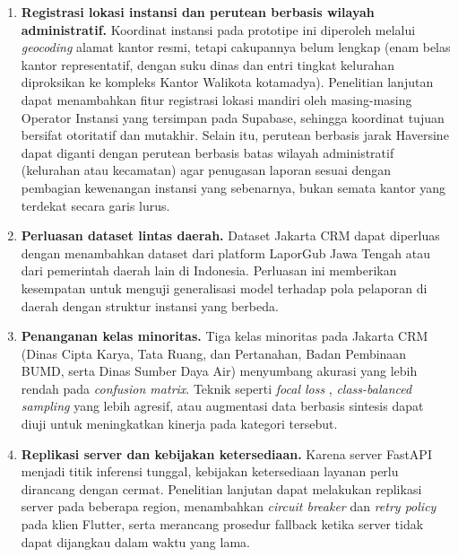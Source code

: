 \begin{enumerate}
    \item \textbf{Registrasi lokasi instansi dan perutean berbasis wilayah administratif.} Koordinat instansi pada prototipe ini diperoleh melalui \textit{geocoding} alamat kantor resmi, tetapi cakupannya belum lengkap (enam belas kantor representatif, dengan suku dinas dan entri tingkat kelurahan diproksikan ke kompleks Kantor Walikota kotamadya). Penelitian lanjutan dapat menambahkan fitur registrasi lokasi mandiri oleh masing-masing Operator Instansi yang tersimpan pada Supabase, sehingga koordinat tujuan bersifat otoritatif dan mutakhir. Selain itu, perutean berbasis jarak Haversine dapat diganti dengan perutean berbasis batas wilayah administratif (kelurahan atau kecamatan) agar penugasan laporan sesuai dengan pembagian kewenangan instansi yang sebenarnya, bukan semata kantor yang terdekat secara garis lurus.

    \item \textbf{Perluasan dataset lintas daerah.} Dataset Jakarta CRM dapat diperluas dengan menambahkan dataset dari platform LaporGub Jawa Tengah \citep{zahroFairerPublicComplaint2025} atau dari pemerintah daerah lain di Indonesia. Perluasan ini memberikan kesempatan untuk menguji generalisasi model terhadap pola pelaporan di daerah dengan struktur instansi yang berbeda.

    \item \textbf{Penanganan kelas minoritas.} Tiga kelas minoritas pada Jakarta CRM (Dinas Cipta Karya, Tata Ruang, dan Pertanahan, Badan Pembinaan BUMD, serta Dinas Sumber Daya Air) menyumbang akurasi yang lebih rendah pada \textit{confusion matrix}. Teknik seperti \textit{focal loss} \citep{zahroFairerPublicComplaint2025}, \textit{class-balanced sampling} yang lebih agresif, atau augmentasi data berbasis sintesis dapat diuji untuk meningkatkan kinerja pada kategori tersebut.

    \item \textbf{Replikasi server dan kebijakan ketersediaan.} Karena server FastAPI menjadi titik inferensi tunggal, kebijakan ketersediaan layanan perlu dirancang dengan cermat. Penelitian lanjutan dapat melakukan replikasi server pada beberapa region, menambahkan \textit{circuit breaker} dan \textit{retry policy} pada klien Flutter, serta merancang prosedur fallback ketika server tidak dapat dijangkau dalam waktu yang lama.


\end{enumerate}
